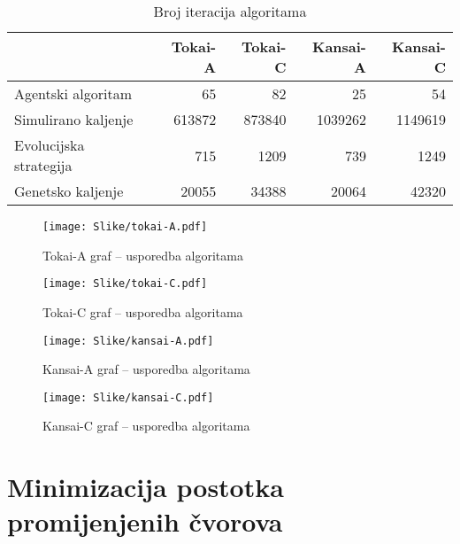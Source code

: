 \documentclass[times, utf8, diplomski, numeric]{fer}
\begin{document}
\begin{table}[htb]
	\caption{Broj iteracija algoritama}
	\label{tbl:meta-iter}
	\centering
	\begin{tabular}{|l||r|r|r||r|} \hline
	& Tokai-A	& Tokai-C	& Kansai-A & Kansai-C \\ \hline \hline
	Agentski algoritam	& 65 & 82	& 25 & 54 \\ \hline
	Simulirano kaljenje	& 613872	& 873840	& 1039262	& 1149619 \\ \hline
	Evolucijska strategija & 715 & 1209	& 739	& 1249 \\ \hline
	Genetsko kaljenje	& 20055	& 34388	& 20064	& 42320 \\ \hline
	\end{tabular}
\end{table}


\begin{figure}[htb]
	\texttt{[image: Slike/tokai-A.pdf]}
	\caption{Tokai-A graf -- usporedba algoritama}
	\label{fig:tokai-A-alg}
\end{figure}

\begin{figure}[htb]
	\texttt{[image: Slike/tokai-C.pdf]}
	\caption{Tokai-C graf -- usporedba algoritama}
	\label{fig:tokai-C-alg}
\end{figure}

\begin{figure}[htb]
	\texttt{[image: Slike/kansai-A.pdf]}
	\caption{Kansai-A graf -- usporedba algoritama}
	\label{fig:kansai-A-alg}
\end{figure}

\begin{figure}[htb]
	\texttt{[image: Slike/kansai-C.pdf]}
	\caption{Kansai-C graf -- usporedba algoritama}
	\label{fig:kansai-C-alg}
\end{figure}


\section{Minimizacija postotka promijenjenih čvorova}
\end{document}
